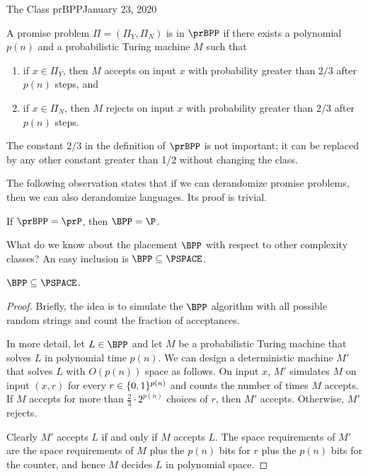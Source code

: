 \begin{lecture}{1}{The Class prBPP}{January 23, 2020}
\begin{definition}[$\prBPP$]
  A promise problem $\Pi = (\Pi_Y, \Pi_N)$ is in $\prBPP$ if there exists a
  polynomial $p(n)$ and a probabilistic Turing machine $M$ such that
  \begin{enumerate}
    \item if $x \in \Pi_Y$, then $M$ accepts on input $x$ with probability
      greater than $2/3$ after $p(n)$ steps, and
    \item if $x \in \Pi_N$, then $M$ rejects on input $x$ with probability
      greater than $2/3$ after $p(n)$ steps.
  \end{enumerate}
\end{definition}

The constant $2/3$ in the definition of $\prBPP$ is not important; it can be
replaced by any other constant greater than 1/2 without changing the class.

The following observation states that if we can derandomize promise problems,
then we can also derandomize languages. Its proof is trivial.

\begin{observation}
  If $\prBPP = \prP$, then $\BPP = \P$.
\end{observation}

What do we know about the placement $\BPP$ with respect to other complexity
classes? An easy inclusion is $\BPP \subseteq \PSPACE$.

\begin{proposition}
  $\BPP \subseteq \PSPACE$.
\end{proposition}
\begin{proof}
  Briefly, the idea is to simulate the $\BPP$ algorithm with all possible
  random strings and count the fraction of acceptances.

  In more detail, let $L \in \BPP$ and let $M$ be a probabilistic Turing
  machine that solves $L$ in polynomial time $p(n)$. We can design a
  deterministic machine $M'$ that solves $L$ with $O(p(n))$ space as follows.
  On input $x$, $M'$ simulates $M$ on input $(x, r)$ for every $r \in
  \{0,1\}^{p(n)}$ and counts the number of times $M$ accepts. If $M$ accepts
  for more than $\frac{2}{3} \cdot 2^{p(n)}$ choices of $r$, then $M'$ accepts.
  Otherwise, $M'$ rejects.

  Clearly $M'$ accepts $L$ if and only if $M$ accepts $L$. The space
  requirements of $M'$ are the space requirements of $M$ plus the $p(n)$ bits
  for $r$ plus the $p(n)$ bits for the counter, and hence $M$ decides $L$ in
  polynomial space.
\end{proof}


\end{lecture}
